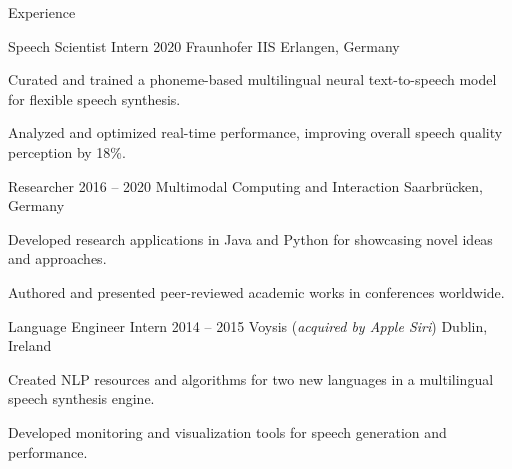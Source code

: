 \documentclass{resume} %
\begin{document}
\begin{rSection}{Experience}
\begin{rSubsection}
	{Speech Scientist Intern}
	{2020}
	{Fraunhofer IIS}
	{Erlangen, Germany}
	
	\setlength{\itemindent}{.5cm}
	
	\item Curated and trained a phoneme-based multilingual neural text-to-speech model for flexible speech synthesis.
	\item Analyzed and optimized real-time performance, improving overall speech quality perception by 18\%.
\end{rSubsection}

\begin{rSubsection}
	{Researcher}
	{2016 -- 2020}
	{Multimodal Computing and Interaction}
	{Saarbrücken, Germany}
	
	\setlength{\itemindent}{.5cm}
	
	\item Developed research applications in Java and Python for showcasing novel ideas and approaches.
	\item Authored and presented peer-reviewed academic works in conferences worldwide.
\end{rSubsection}

%	
%	

\begin{rSubsection}
	{Language Engineer Intern}
	{2014 -- 2015}
	{Voysis (\textit{acquired by Apple Siri})}
	{Dublin, Ireland}
	
	\setlength{\itemindent}{.5cm}

	\item Created NLP resources and algorithms for two new languages in a multilingual speech synthesis engine.
	\item Developed monitoring and visualization tools for speech generation and performance.
\end{rSubsection}


\end{rSection}
\end{document}
